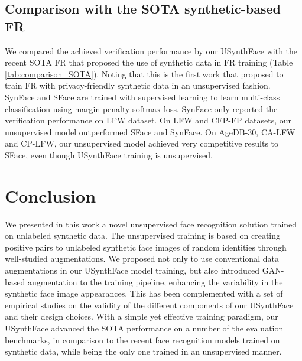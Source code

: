 \documentclass[10pt,twocolumn,letterpaper]{ieeeconf}
\begin{document}
\subsection{Comparison with the SOTA synthetic-based FR}
We compared the achieved verification performance by our USynthFace with the recent SOTA FR that proposed the use of synthetic data in FR training (Table \ref{tab:comparison_SOTA}). Noting that this is the first work that proposed to train FR with privacy-friendly synthetic data in an unsupervised fashion. SynFace \cite{SynFace} and SFace \cite{SFace} are trained with supervised learning to learn multi-class classification using margin-penalty softmax loss. SynFace only reported the verification performance on LFW dataset.
On LFW and CFP-FP datasets, our unsupervised model outperformed SFace and SynFace. On AgeDB-30, CA-LFW and CP-LFW, our unsupervised model achieved very competitive results to SFace, even though USynthFace training is unsupervised. 








\section{Conclusion}
We presented in this work a novel unsupervised face recognition solution trained on unlabeled synthetic data.
The unsupervised training is based on creating positive pairs to unlabeled synthetic face images of random identities through well-studied augmentations.
We proposed not only to use conventional data augmentations in our USynthFace model training, but also introduced GAN-based augmentation to the training pipeline, enhancing the variability in the synthetic face image appearances.
This has been complemented with a set of empirical studies on the validity of the different components of our USynthFace and their design choices. With a simple yet effective training paradigm, our USynthFace advanced the SOTA performance on a number of the evaluation benchmarks, in comparison to the recent face recognition models trained on synthetic data, while being the only one trained in an unsupervised manner.    



\vspace{-2mm}









{\small


}
\end{document}
